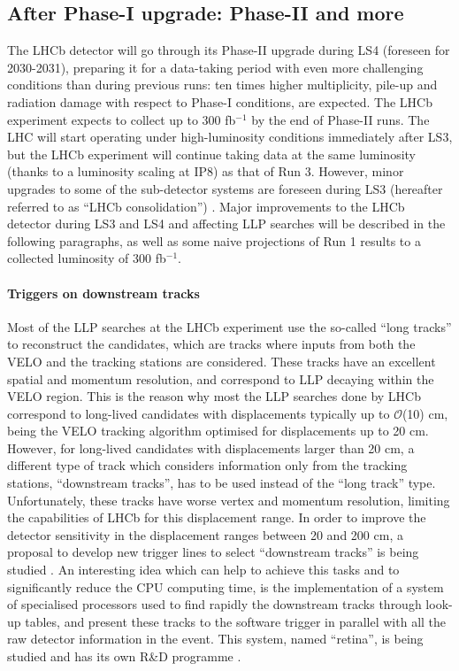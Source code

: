 \subsection{After Phase-I upgrade: Phase-II and more}
\label{sec:ulhcbphaseii}

The LHCb detector will go through its Phase-II upgrade during LS4 (foreseen for 2030-2031), preparing it for a data-taking period with even more challenging conditions than during previous runs: ten times higher multiplicity, pile-up and radiation damage with respect to Phase-I conditions, are expected. The LHCb experiment expects to collect up to 300 fb$^{-1}$ by the end of Phase-II runs. The LHC will start operating under high-luminosity conditions immediately after LS3, but the LHCb experiment will continue taking data at the same luminosity (thanks to a luminosity scaling at IP8) as that of Run 3. However, minor upgrades to some of the sub-detector systems are foreseen during LS3 (hereafter referred to as ``LHCb consolidation'') \cite{Aaij:2244311}. Major improvements to the LHCb detector during LS3 and LS4 and affecting LLP searches will be described in the following paragraphs, as well as some naive projections of Run 1 results to a collected luminosity of 300 fb$^{-1}$. 

\paragraph{Triggers on downstream tracks}
Most of the LLP searches at the LHCb experiment use the so-called ``long tracks'' to reconstruct the candidates, which are tracks where inputs from both the VELO and the tracking stations are considered. These tracks have an excellent spatial and momentum resolution, and correspond to LLP decaying within the VELO region. This is the reason why most the LLP searches done by LHCb correspond to long-lived candidates with displacements typically up to $\mathcal{O}$(10) cm, being the VELO tracking algorithm optimised for displacements up to 20 cm. However, for long-lived candidates with displacements larger than 20 cm, a different type of track which considers information only from the tracking stations, ``downstream tracks'', has to be used instead of the ``long track'' type. Unfortunately, these tracks have worse vertex and momentum resolution, limiting the capabilities of LHCb for this displacement range. In order to improve the detector sensitivity in the displacement ranges between 20 and 200 cm, a proposal to develop new trigger lines to select ``downstream tracks'' is being studied \cite{Aaij:2244312}. An interesting idea which can help to achieve this tasks and to significantly reduce the CPU computing time, is the implementation of a system of specialised processors used to find rapidly the downstream tracks through look-up tables, and present these tracks to the software trigger in parallel with all the raw detector information in the event. This system, named ``retina'', is being studied and has its own R\&D programme \cite{retina}. 

